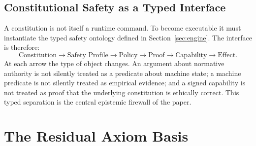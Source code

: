 \documentclass[11pt]{article}
\begin{document}
\subsection{Constitutional Safety as a Typed Interface}
A constitution is not itself a runtime command. To become executable it must instantiate the typed safety ontology defined in Section~\ref{sec:engine}. The interface is therefore:
\[
\text{Constitution}\rightarrow\text{Safety Profile}\rightarrow\text{Policy}\rightarrow\text{Proof}\rightarrow\text{Capability}\rightarrow\text{Effect}.
\]
At each arrow the type of object changes. An argument about normative authority is not silently treated as a predicate about machine state; a machine predicate is not silently treated as empirical evidence; and a signed capability is not treated as proof that the underlying constitution is ethically correct. This typed separation is the central epistemic firewall of the paper.

\section{The Residual Axiom Basis}\label{sec:rab}
\end{document}
